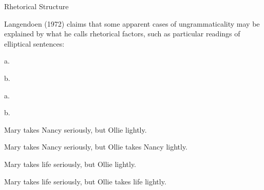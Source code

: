 \begin{styleHeadingviii}
Rhetorical Structure
\end{styleHeadingviii}


\begin{styleStandard}
Langendoen (1972) claims that some apparent cases of ungrammaticality may be explained by what he calls rhetorical factors, such as particular readings of elliptical sentences:
\end{styleStandard}


\begin{multicols}{2}
\setcounter{listWWNumxxivleveli}{18}
\begin{listWWNumxxivleveli}
\item 
\begin{styleStandard}
a.
\end{styleStandard}


\end{listWWNumxxivleveli}
\begin{styleStandard}
b.
\end{styleStandard}


\begin{listWWNumxxivleveli}
\item 
\begin{styleStandard}
a.
\end{styleStandard}


\end{listWWNumxxivleveli}
\begin{styleStandard}
b.
\end{styleStandard}


\begin{styleStandard}
Mary takes Nancy seriously, but Ollie lightly.
\end{styleStandard}


\begin{styleStandard}
Mary takes Nancy seriously, but Ollie takes Nancy lightly.
\end{styleStandard}


\begin{styleStandard}
Mary takes life seriously, but Ollie lightly.
\end{styleStandard}


\begin{styleStandard}
Mary takes life seriously, but Ollie takes life lightly.
\end{styleStandard}


\end{multicols}
